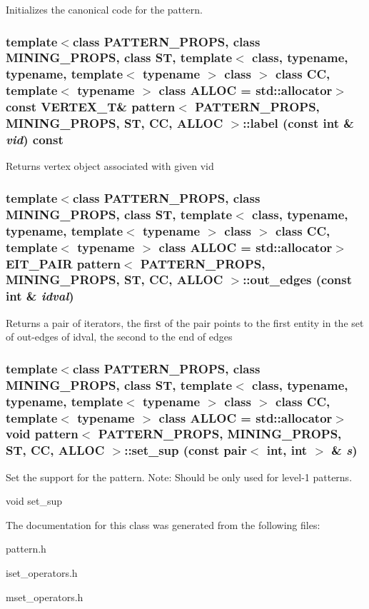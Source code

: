 Initializes the canonical code for the pattern. 
\subsubsection{\setlength{\rightskip}{0pt plus 5cm}template$<$class PATTERN\_\-PROPS, class MINING\_\-PROPS, class ST, template$<$ class, typename, typename, template$<$ typename $>$ class $>$ class CC, template$<$ typename $>$ class ALLOC = std::allocator$>$ const VERTEX\_\-T\& \bf{pattern}$<$ PATTERN\_\-PROPS, MINING\_\-PROPS, ST, CC, ALLOC $>$::label (const int \& {\em vid}) const\hspace{0.3cm}{\tt  [inline]}}\label{classpattern_4e1adb7fbf83795c46cdedd9d5a0c923}


Returns vertex object associated with given vid 
\subsubsection{\setlength{\rightskip}{0pt plus 5cm}template$<$class PATTERN\_\-PROPS, class MINING\_\-PROPS, class ST, template$<$ class, typename, typename, template$<$ typename $>$ class $>$ class CC, template$<$ typename $>$ class ALLOC = std::allocator$>$ EIT\_\-PAIR \bf{pattern}$<$ PATTERN\_\-PROPS, MINING\_\-PROPS, ST, CC, ALLOC $>$::out\_\-edges (const int \& {\em idval})\hspace{0.3cm}{\tt  [inline]}}\label{classpattern_5a5426b0329b48ae69012d2a4acc890f}


Returns a pair of iterators, the first of the pair points to the first entity in the set of out-edges of idval, the second to the end of edges 
\subsubsection{\setlength{\rightskip}{0pt plus 5cm}template$<$class PATTERN\_\-PROPS, class MINING\_\-PROPS, class ST, template$<$ class, typename, typename, template$<$ typename $>$ class $>$ class CC, template$<$ typename $>$ class ALLOC = std::allocator$>$ void \bf{pattern}$<$ PATTERN\_\-PROPS, MINING\_\-PROPS, ST, CC, ALLOC $>$::set\_\-sup (const pair$<$ int, int $>$ \& {\em s})\hspace{0.3cm}{\tt  [inline]}}\label{classpattern_93f1532b84b16da807a4e1386b95dcbc}


Set the support for the pattern. Note: Should be only used for level-1 patterns. 

void set\_\-sup 

The documentation for this class was generated from the following files:\begin{CompactItemize}
\item 
pattern.h\item 
iset\_\-operators.h\item 
mset\_\-operators.h\end{CompactItemize}
